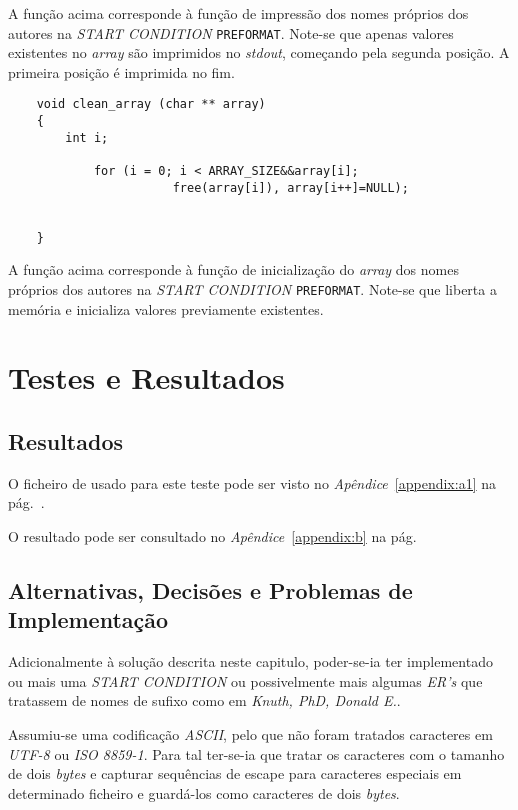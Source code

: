 A função acima corresponde à função de impressão dos nomes próprios dos autores
na \emph{START CONDITION} \texttt{PREFORMAT}. Note-se que apenas valores
existentes no \emph{array} são imprimidos no \emph{stdout}, começando pela
segunda posição. A primeira posição é imprimida no fim.

\begin{Verbatim}
	void clean_array (char ** array)
	{
	    int i;
		
			for (i = 0; i < ARRAY_SIZE&&array[i]; 
			           free(array[i]), array[i++]=NULL);
			
			
	}

\end{Verbatim}

A função acima corresponde à função de inicialização do \emph{array} dos nomes
próprios dos autores na \emph{START CONDITION} \texttt{PREFORMAT}. Note-se que
liberta a memória e inicializa valores previamente existentes.


\section{Testes e Resultados}
\label{sec:ts:b1}
\subsection{Resultados}


O ficheiro de usado para este teste pode ser visto no
\emph{Apêndice}~\ref{appendix:a1} na pág.~\pageref{appendix:a1}. 

O resultado pode ser consultado no \emph{Apêndice}~\ref{appendix:b} na
pág.~\pageref{appendix:b}

\subsection{Alternativas, Decisões e Problemas de Implementação}

Adicionalmente à solução descrita neste capitulo, poder-se-ia ter implementado
ou mais uma \emph{START CONDITION} ou possivelmente mais algumas \emph{ER's}
que tratassem de nomes de sufixo como em  \emph{Knuth, PhD, Donald E.}.

Assumiu-se uma codificação \emph{ASCII}, pelo que não foram tratados caracteres
em \emph{UTF-8} ou \emph{ISO 8859-1}. Para tal ter-se-ia que tratar os
caracteres com o tamanho de dois \emph{bytes} e capturar sequências de escape
para caracteres especiais em determinado ficheiro  e guardá-los
como caracteres de dois \emph{bytes}. 






